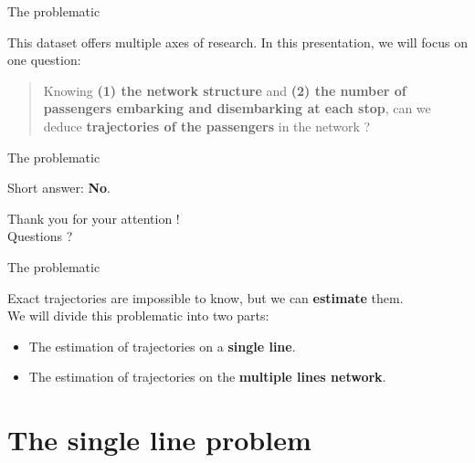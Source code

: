 \documentclass[10pt]{beamer}
\newcommand{\imp}[1]{\textbf{\color{cyan}#1}}
\begin{document}

	\begin{frame}{The problematic}
		
		This dataset offers multiple axes of research. In this presentation, we will focus on one question: \vspace{0.4cm}
		
		\begin{quotation}
			\large
			Knowing \imp{(1) the network structure} and \imp{(2) the number of passengers embarking and disembarking at each stop}, can we deduce \imp{trajectories of the passengers} in the network ?
		\end{quotation}
		
	\end{frame}

	
	\begin{frame}{The problematic}
		
		Short answer: {\large \imp{No}}.
		
		\begin{center}
			\huge Thank you for your attention ! \\
			Questions ?
		\end{center}
		
	\end{frame}
	
	
	\begin{frame}{The problematic}
		
		Exact trajectories are impossible to know, but we can \imp{estimate} them. \\
		\vspace{0.4cm}
		We will divide this problematic into two parts:
		\begin{itemize}
			\item The estimation of trajectories on a \imp{single line}.
			\item The estimation of trajectories on the \imp{multiple lines network}.
		\end{itemize}
		
	\end{frame}
	
	
	\section{The single line problem}
	
\end{document}
